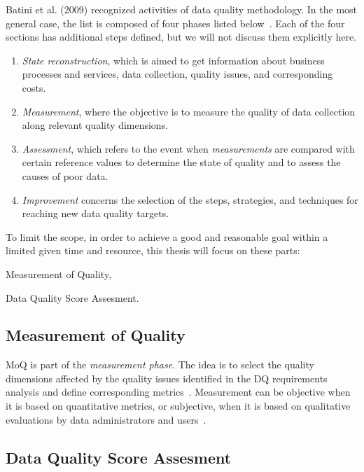 Batini et al. (2009) recognized activities of data quality methodology.
In the most general case, the list is composed of four phases listed below~\cite{batini2009}.
Each of the four sections has additional steps defined, but we will not discuss them explicitly here.

\begin{enumerate}
    \item \textit{State reconstruction}, which is aimed to get information about business processes and services, data collection, quality issues, and corresponding costs.
    \item \textit{Measurement}, where the objective is to measure the quality of data collection along relevant quality dimensions.
    \item \textit{Assessment}, which refers to the event when \textit{measurements} are compared with certain reference values to determine the state of quality and to assess the causes of poor data.
    \item \textit{Improvement} concerns the selection of the steps, strategies, and techniques for reaching new data quality targets.
\end{enumerate}

To limit the scope, in order to achieve a good and reasonable goal within a limited given time and resource, this thesis will focus on these parts:
\begin{enumerate*}[label=(\roman*)]
    \item Measurement of Quality,
    \item Data Quality Score Assesment.
\end{enumerate*}

\subsection*{Measurement of Quality}

MoQ is part of the \textit{measurement phase}.
The idea is to select the quality dimensions affected by the quality issues identified in the DQ requirements analysis and define corresponding metrics~\cite{loshin2008}.
Measurement can be objective when it is based on quantitative metrics, or subjective, when it is based on qualitative evaluations by data administrators and users~\cite{loshin2008}.

\subsection*{Data Quality Score Assesment}

